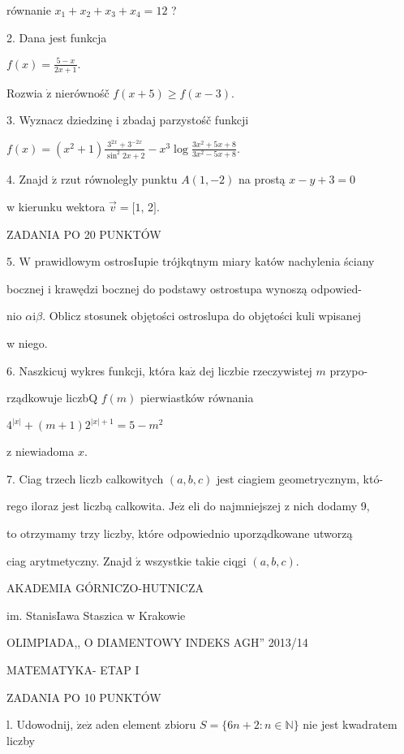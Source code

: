 \documentclass[a4paper,12pt]{article}
\begin{document}
równanie $x_{1}+x_{2}+x_{3}+x_{4}=12$ ?

2. Dana jest funkcja

$f(x)=\displaystyle \frac{5-x}{2x+1}.$

Rozwia $\dot{\mathrm{z}}$ nierównośč $f(x+5)\geq f(x-3).$

3. Wyznacz dziedzinę i zbadaj parzystośč funkcji

$f(x)=(x^{2}+1)\displaystyle \frac{3^{2x}+3^{-2x}}{\sin^{2}2x+2}-x^{3}\log\frac{3x^{2}+5x+8}{3x^{2}-5x+8}.$

4. Znajd $\acute{\mathrm{z}}$ rzut równolegly punktu $A(1,-2)$ na prostą $x-y+3 = 0$

w kierunku wektora $\vec{v}=[1$, 2$].$

ZADANIA PO 20 PUNKTÓW

5. $\mathrm{W}$ prawidlowym ostrosIupie trójkqtnym miary katów nachylenia ściany

bocznej i krawędzi bocznej do podstawy ostrostupa wynoszą odpowied-

nio $\alpha \mathrm{i}\beta$. Oblicz stosunek objętości ostroslupa do objętości kuli wpisanej

w niego.

6. Naszkicuj wykres funkcji, która $\mathrm{k}\mathrm{a}\dot{\mathrm{z}}$ dej liczbie rzeczywistej $m$ przypo-

rządkowuje liczbQ $f(m)$ pierwiastków równania

$4^{|x|}+(m+1)2^{|x|+1}=5-m^{2}$

z niewiadoma $x.$

7. Ciag trzech liczb calkowitych $(a,b,c)$ jest ciagiem geometrycznym, któ-

rego iloraz jest liczbą calkowita. $\mathrm{J}\mathrm{e}\dot{\mathrm{z}}$ eli do najmniejszej z nich dodamy 9,

to otrzymamy trzy liczby, które odpowiednio uporządkowane utworzą

ciag arytmetyczny. Znajd $\acute{\mathrm{z}}$ wszystkie takie ciqgi $(a,b,c).$






AKADEMIA GÓRNICZO-HUTNICZA

im. StanisIawa Staszica w Krakowie

OLIMPIADA,, O DIAMENTOWY INDEKS AGH'' 2013/14

MATEMATYKA- ETAP I

ZADANIA PO 10 PUNKTÓW

l. Udowodnij, $\dot{\mathrm{z}}\mathrm{e}\dot{\mathrm{z}}$ aden element zbioru $S=\{6n+2:n\in \mathbb{N}\}$ nie jest kwadratem liczby
\end{document}
